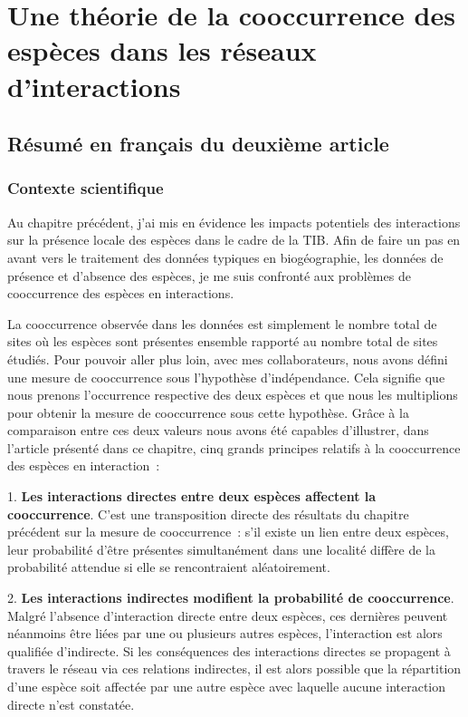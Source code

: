 \chapter{Une théorie de la cooccurrence des espèces dans les réseaux d'interactions}
\label{chap2}

\section{Résumé en français du deuxième article}


\subsection{Contexte scientifique}

Au chapitre précédent, j'ai mis en évidence les impacts potentiels des
interactions sur la présence locale des espèces dans le cadre de la TIB.
Afin de faire un pas en avant vers le traitement des données typiques en
biogéographie, les données de présence et d'absence des espèces, je me suis
confronté aux problèmes de cooccurrence des espèces en interactions.

La cooccurrence observée dans les données est simplement le nombre total de
sites où les espèces sont présentes ensemble rapporté au nombre total de sites
étudiés. Pour pouvoir aller plus loin, avec mes collaborateurs, nous avons
défini une mesure de cooccurrence sous l'hypothèse d'indépendance.
Cela signifie que nous prenons l'occurrence respective des deux espèces
et que nous les multiplions pour obtenir la mesure de cooccurrence sous
cette hypothèse. Grâce à la comparaison entre ces deux valeurs nous avons été
capables d'illustrer, dans l'article présenté dans ce chapitre, cinq grands
principes relatifs à la cooccurrence des espèces en interaction~:

1. \textbf{Les interactions directes entre deux espèces affectent la cooccurrence}.
C'est une transposition directe des résultats du chapitre précédent
sur la mesure de cooccurrence~: s'il existe un lien entre deux espèces,
leur probabilité d'être présentes simultanément dans une localité diffère de la
probabilité attendue si elle se rencontraient aléatoirement.

2. \textbf{Les interactions indirectes modifient la probabilité de cooccurrence}.
Malgré l'absence d'interaction directe entre deux espèces, ces dernières peuvent
néanmoins être liées par une ou plusieurs autres espèces, l'interaction est
alors qualifiée d'indirecte. Si les conséquences des interactions directes se
propagent à travers le réseau via ces relations indirectes, il est alors
possible que la répartition d'une espèce soit affectée par une autre espèce avec
laquelle aucune interaction directe n'est constatée.

